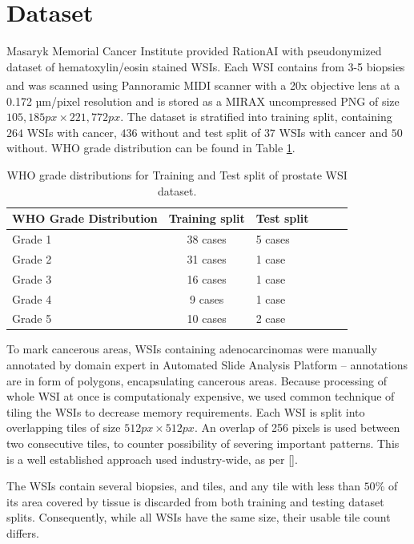 \section{Dataset}

Masaryk Memorial Cancer Institute provided RationAI with pseudonymized dataset of hematoxylin/eosin stained WSIs. Each WSI contains from 3-5 biopsies and was scanned using Pannoramic\textsuperscript{\textregistered} MIDI scanner with a 20x objective lens at a 0.172 µm/pixel resolution and is stored as a MIRAX uncompressed PNG of size $105,185 px \times 221,772 px$. The dataset is stratified into training split, containing $264$ WSIs with cancer, $436$ without and test split of $37$ WSIs with cancer and $50$ without. WHO grade distribution can be found in Table \ref{tab:who_grade_distribution}.

\begin{table}[h!]
\centering
{}
\begin{tabular}{@{}l c l c l c @{}}\toprule
WHO Grade Distribution & Training split & Test split \\ 
\midrule
Grade 1         & 38 cases            & 5 cases      \\
Grade 2         & 31 cases            & 1 case       \\
Grade 3         & 16 cases            & 1 case       \\
Grade 4         & 9 cases             & 1 case       \\
Grade 5         & 10 cases            & 2 case       \\
\bottomrule
\end{tabular}
\caption{WHO grade distributions for Training and Test split of prostate WSI dataset.}
\label{tab:who_grade_distribution}
\end{table}

To mark cancerous areas, WSIs containing adenocarcinomas were manually annotated by domain expert in Automated Slide Analysis Platform -- annotations are in form of polygons, encapsulating cancerous areas. Because processing of whole WSI at once is computationaly expensive, we used common technique of tiling the WSIs to decrease memory requirements. Each WSI is split into overlapping tiles of size $512px \times 512px$. An overlap of 256 pixels is used between two consecutive tiles, to counter possibility of severing important patterns. This is a well established approach used industry-wide, as per [].

The WSIs contain several biopsies, and tiles, and any tile with less than $50$\% of its area covered by tissue is discarded from both training and testing dataset splits. Consequently, while all WSIs have the same size, their usable tile count differs.

